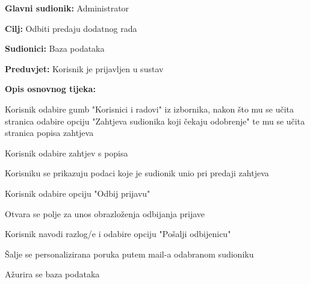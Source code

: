 					\noindent {}
					\begin{packed_item}
	
						\item \textbf{Glavni sudionik: } Administrator
						\item  \textbf{Cilj:} Odbiti predaju dodatnog rada
						\item  \textbf{Sudionici:} Baza podataka
						\item  \textbf{Preduvjet:} Korisnik je prijavljen u sustav
						\item  \textbf{Opis osnovnog tijeka:}
						
						\item[] \begin{packed_enum}
	
							\item Korisnik odabire gumb "Korisnici i radovi" iz izbornika, nakon što mu se učita stranica odabire opciju "Zahtjeva sudionika koji čekaju odobrenje" te mu se učita stranica popisa zahtjeva
							\item Korisnik odabire zahtjev s popisa
							\item Korisniku se prikazuju podaci koje je sudionik unio pri predaji zahtjeva
							\item Korisnik odabire opciju "Odbij prijavu"
							\item Otvara se polje za unos obrazloženja odbijanja prijave
							\item Korisnik navodi razlog/e i odabire opciju "Pošalji odbijenicu"
							\item Šalje se personalizirana poruka putem mail-a odabranom sudioniku
							\item Ažurira se baza podataka

					
						\end{packed_enum}
			
					\end{packed_item}

